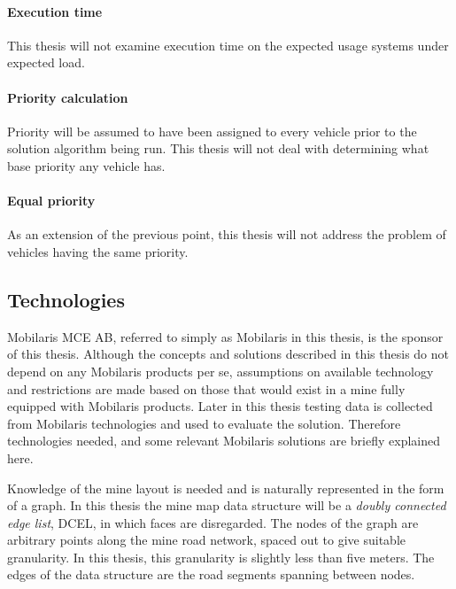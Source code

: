 \documentclass{article}
\begin{document}
				\paragraph{Execution time}
					This thesis will not examine execution time on the expected usage systems under expected load.
				\paragraph{Priority calculation}
					Priority will be assumed to have been assigned to every vehicle prior to the solution algorithm being run. This thesis will not deal with determining what base priority any vehicle has.
				\paragraph{Equal priority}
					As an extension of the previous point, this thesis will not address the problem of vehicles having the same priority.


		\subsection{Technologies}
			Mobilaris MCE AB, referred to simply as Mobilaris in this thesis, is the sponsor of this thesis. %
			Although the concepts and solutions described in this thesis do not depend on any Mobilaris products per se, assumptions on available technology and restrictions are made based on those that would exist in a mine fully equipped with Mobilaris products. Later in this thesis testing data is collected from Mobilaris technologies and used to evaluate the solution. Therefore technologies needed, and some relevant Mobilaris solutions are briefly explained here.

			Knowledge of the mine layout is needed and is naturally represented in the form of a graph. In this thesis the mine map data structure will be a \textit{doubly connected edge list}, DCEL, \cite{ComputationalGeometry} in which faces are disregarded. The nodes of the graph are arbitrary points along the mine road network, spaced out to give suitable granularity. In this thesis, this granularity is slightly less than five meters. The edges of the data structure are the road segments spanning between nodes.
\end{document}
